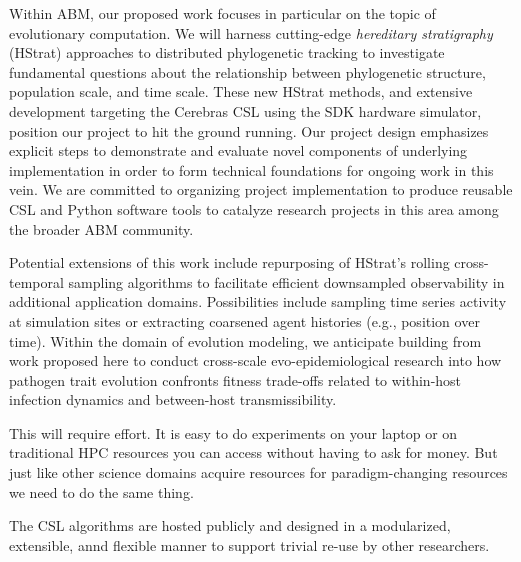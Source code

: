 Within ABM, our proposed work focuses in particular on the topic of evolutionary computation.
We will harness cutting-edge \textit{hereditary stratigraphy} (HStrat) approaches to distributed phylogenetic tracking to investigate fundamental questions about the relationship between phylogenetic structure, population scale, and time scale.
These new HStrat methods, and extensive development targeting the Cerebras CSL using the SDK hardware simulator, position our project to hit the ground running.
Our project design emphasizes explicit steps to demonstrate and evaluate novel components of underlying implementation in order to form technical foundations for ongoing work in this vein.
We are committed to organizing project implementation to produce reusable CSL and Python software tools to catalyze research projects in this area among the broader ABM community.

Potential extensions of this work include repurposing of HStrat's rolling cross-temporal sampling algorithms to facilitate efficient downsampled observability in additional application domains.
Possibilities include sampling time series activity at simulation sites or extracting coarsened agent histories (e.g., position over time).
Within the domain of evolution modeling, we anticipate building from work proposed here to conduct cross-scale evo-epidemiological research into how pathogen trait evolution confronts fitness trade-offs related to within-host infection dynamics and between-host transmissibility.

This will require effort.
It is easy to do experiments on your laptop or on traditional HPC resources you can access without having to ask for money.
But just like other science domains acquire resources for paradigm-changing resources we need to do the same thing.

The CSL algorithms are hosted publicly and designed in a modularized, extensible, annd flexible manner to support trivial re-use by other researchers.
